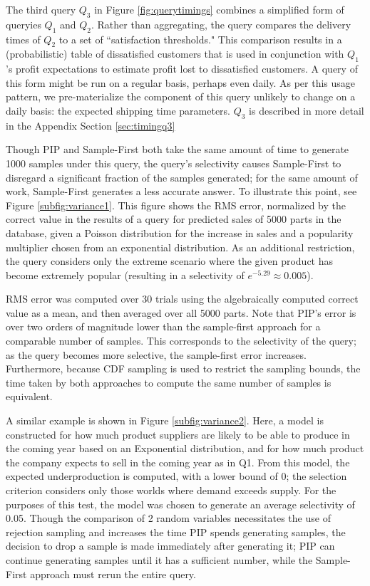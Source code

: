 The third query $Q_3$ in Figure \ref{fig:querytimings} combines a simplified form of queryies $Q_1$ and $Q_2$.  Rather than aggregating, the query compares the delivery times of $Q_2$ to a set of ``satisfaction thresholds."  This comparison results in a (probabilistic) table of dissatisfied customers that is used in conjunction with $Q_1$'s profit expectations to estimate profit lost to dissatisfied customers.  A query of this form might be run on a regular basis, perhaps even daily.  As per this usage pattern, we pre-materialize the component of this query unlikely to change on a daily basis: the expected shipping time parameters.  $Q_3$ is described in more detail in the Appendix Section \ref{sec:timingq3}

Though PIP and Sample-First both take the same amount of time to generate 1000 samples under this query, the query's selectivity causes Sample-First to disregard a significant fraction of the samples generated; for the same amount of work, Sample-First generates a less accurate answer.  To illustrate this point, see Figure \ref{subfig:variance1}.  This figure shows the RMS error, normalized by the correct value in the results of a query for predicted sales of 5000 parts in the database, given a Poisson distribution for the increase in sales and a popularity multiplier chosen from an exponential distribution.  As an additional restriction, the query considers only the extreme scenario where the given product has become extremely popular (resulting in a selectivity of $e^{-5.29} \approx 0.005$).  

RMS error was computed over 30 trials using the algebraically computed correct value as a mean, and then averaged over all 5000 parts.  Note that PIP's error is over two orders of magnitude lower than the sample-first approach for a comparable number of samples.  This corresponds to the selectivity of the query; as the query becomes more selective, the sample-first error increases.  Furthermore, because CDF sampling is used to restrict the sampling bounds, the time taken by both approaches to compute the same number of samples is equivalent.

A similar example is shown in Figure \ref{subfig:variance2}.  Here, a model is constructed for how much product suppliers are likely to be able to produce in the coming year based on an Exponential distribution, and for how much product the company expects to sell in the coming year as in Q1.  From this model, the expected underproduction is computed, with a lower bound of 0; the selection criterion considers only those worlds where demand exceeds supply.  For the purposes of this test, the model was chosen to generate an average selectivity of 0.05.  Though the comparison of 2 random variables necessitates the use of rejection sampling and increases the time PIP spends generating samples, the decision to drop a sample is made immediately after generating it; PIP can continue generating samples until it has a sufficient number, while the Sample-First approach must rerun the entire query.

